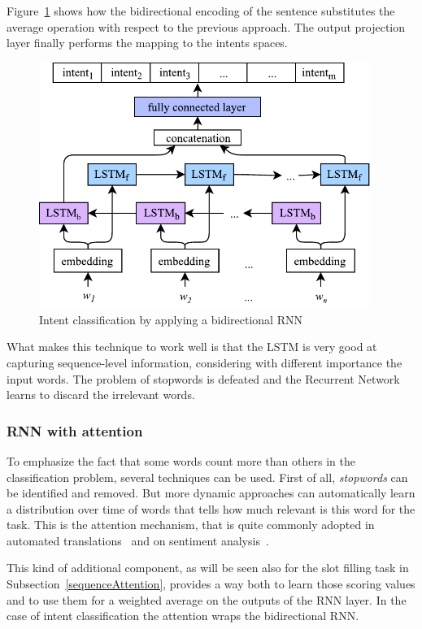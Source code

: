 Figure~\ref{fig:intentBidirectionalRNN} shows how the bidirectional encoding of the sentence substitutes the average operation with respect to the previous approach. The output projection layer finally performs the mapping to the intents spaces.

\begin{figure}[!htb]
    \centering
    \includegraphics[max width=0.7\linewidth,max height=8cm,keepaspectratio]{figures/intentBidirectionalRNN}
    \caption{Intent classification by applying a bidirectional RNN}\label{fig:intentBidirectionalRNN}
\end{figure}

What makes this technique to work well is that the LSTM is very good at capturing sequence-level information, considering with different importance the input words. The problem of stopwords is defeated and the Recurrent Network learns to discard the irrelevant words.

\subsubsection{RNN with attention}
To emphasize the fact that some words count more than others in the classification problem, several techniques can be used. First of all, \textit{stopwords} can be identified and removed. But more dynamic approaches can automatically learn a distribution over time of words that tells how much relevant is this word for the task. This is the attention mechanism, that is quite commonly adopted in automated translations~\cite{bahdanau2014neural} and on sentiment analysis~\cite{lin2017structured}.

This kind of additional component, as will be seen also for the slot filling task in Subsection~\ref{sequenceAttention}, provides a way both to learn those scoring values and to use them for a weighted average on the outputs of the RNN layer. In the case of intent classification the attention wraps the bidirectional RNN.

